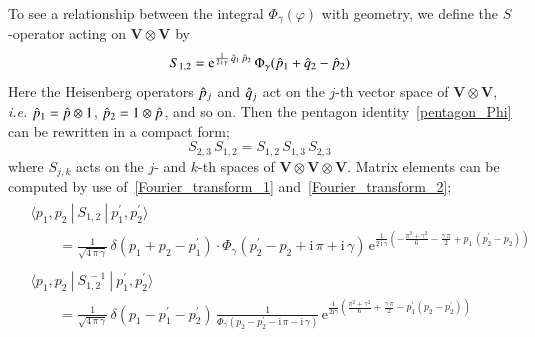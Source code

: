 \documentclass[12pt,reqno]{amsart}
\numberwithin{equation}{section}
\newcommand{\I}{\mathrm{i}}
\newcommand{\E}{\mathrm{e}}
\begin{document}
To see a relationship between the integral $\Phi_\gamma(\varphi)$ with
geometry,
we   define the $S$-operator acting  on $\mathbf{V}\otimes\mathbf{V}$ by
\begin{equation}
  \label{define_S_operator}
  S_{1,2}
  =
  \E^{
    \frac{1}{2 \,  \I\, \gamma} \,
    \Hat{q}_1 \, \Hat{p}_2
    } \,
  \Phi_\gamma (\Hat{p}_1 + \Hat{q}_2 - \Hat{p}_2) 
\end{equation}
Here  the Heisenberg operators $\Hat{p}_j$
and $\Hat{q}_j$ act on the $j$-th  vector
space of $\mathbf{V}\otimes\mathbf{V}$,
\emph{i.e.}
$\Hat{p}_1 = \Hat{p} \otimes 1$,
$\Hat{p}_2 = 1 \otimes \Hat{p} $, and so on.
Then the pentagon identity~\eqref{pentagon_Phi} can be
rewritten  in a compact form;
\begin{equation}
  \label{pentagon_S}
  S_{2,3} \, S_{1,2}
  =
  S_{1,2} \, S_{1,3} \, S_{2,3} 
\end{equation}
where $S_{j,k}$ acts on the $j$- and $k$-th spaces of
$\mathbf{V}\otimes \mathbf{V} \otimes \mathbf{V}$.
Matrix elements can be computed by use of~\eqref{Fourier_transform_1}
and~\eqref{Fourier_transform_2};
\begin{subequations}
  \label{S_element_2}
  \begin{gather}
    \begin{split}
      & \langle p_1, p_2  \ | \ S_{1, 2}  \ | \ p_1^\prime , p_2^\prime \rangle
      \\
      &  \qquad =
      \frac{1}{\sqrt{4 \, \pi \, \gamma}} \,
      \delta(p_1 + p_2 - p_1^\prime) \cdot
      \Phi_\gamma(p_2^\prime - p_2
      + \I \, \pi + \I \, \gamma) \,
      \E^{\frac{1}{2 \, \I \, \gamma}
        \left(
          - \frac{\pi^2 + \gamma^2}{6} - \frac{\gamma \, \pi}{2}
          + p_1 \, (p_2^\prime - p_2)
        \right)
        } 
    \end{split}
    \\[4mm]
%
    \begin{split}
      & \langle p_1, p_2 \ | \ S_{1, 2}^{~-1} \ | \ p_1^\prime , p_2^\prime
      \rangle
      \\
      &  \qquad =
      \frac{1}{\sqrt{4 \, \pi \, \gamma}} \,
      \delta(p_1 - p_1^\prime - p_2^\prime) \,
      \frac{1}{
        \Phi_\gamma(p_2 - p_2^\prime - \I \, \pi
        - \I \, \gamma)
        } \,
      \E^{
        \frac{1}{2 \I \gamma}
        \left(
        \frac{\pi^2 + \gamma^2}{6}
        + \frac{\gamma \, \pi}{2}
        - p_1^\prime ( p_2 - p_2^\prime)
        \right)
        } 
    \end{split}
  \end{gather}
\end{subequations}
\end{document}
